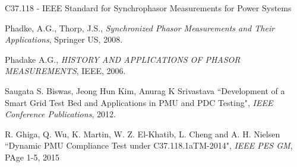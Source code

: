 \begin{thebibliography}{25}
 C37.118 - IEEE Standard for Synchrophasor Measurements for Power Systems

Phadke, A.G., Thorp, J.S.,  \textit{Synchronized Phasor Measurements and Their Applications}, Springer US, 2008.

Phadake A.G., \textit{HISTORY AND APPLICATIONS OF PHASOR MEASUREMENTS}, IEEE, 2006.

Saugata S. Biswas, Jeong Hun Kim, Anurag K Srivastava ``Development of a Smart Grid Test Bed and Applications in PMU and PDC Testing", \textit{IEEE Conference Publications}, 2012.

R. Ghiga, Q. Wu, K. Martin, W. Z. El-Khatib, L. Cheng and A. H. Nielsen ``Dynamic PMU Compliance Test under C37.118.1aTM-2014", \textit{IEEE PES GM}, PAge 1-5, 2015

\end{thebibliography}